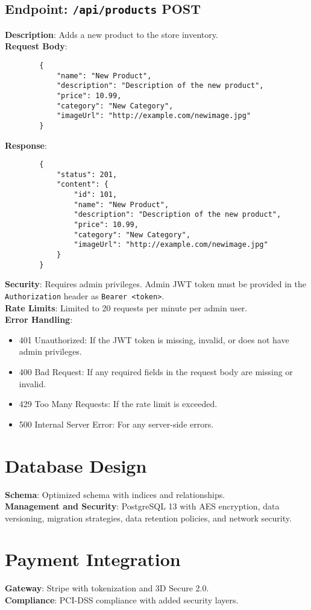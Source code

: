 \documentclass[a4paper,12pt]{article}
\begin{document}
	\subsection*{Endpoint: \texttt{/api/products} POST}
	\textbf{Description}: Adds a new product to the store inventory. \\
	\textbf{Request Body}:
	\begin{lstlisting}
		{
			"name": "New Product",
			"description": "Description of the new product",
			"price": 10.99,
			"category": "New Category",
			"imageUrl": "http://example.com/newimage.jpg"
		}
	\end{lstlisting}
	\textbf{Response}:
	\begin{lstlisting}
		{
			"status": 201,
			"content": {
				"id": 101,
				"name": "New Product",
				"description": "Description of the new product",
				"price": 10.99,
				"category": "New Category",
				"imageUrl": "http://example.com/newimage.jpg"
			}
		}
	\end{lstlisting}
	\textbf{Security}: Requires admin privileges. Admin JWT token must be provided in the \texttt{Authorization} header as \texttt{Bearer <token>}. \\
	\textbf{Rate Limits}: Limited to 20 requests per minute per admin user. \\
	\textbf{Error Handling}:
	\begin{itemize}
		\item 401 Unauthorized: If the JWT token is missing, invalid, or does not have admin privileges.
		\item 400 Bad Request: If any required fields in the request body are missing or invalid.
		\item 429 Too Many Requests: If the rate limit is exceeded.
		\item 500 Internal Server Error: For any server-side errors.
	\end{itemize}
	
	\section*{Database Design}
	\textbf{Schema}: Optimized schema with indices and relationships. \\
	\textbf{Management and Security}: PostgreSQL 13 with AES encryption, data versioning, migration strategies, data retention policies, and network security.
	
	\section*{Payment Integration}
	\textbf{Gateway}: Stripe with tokenization and 3D Secure 2.0. \\
	\textbf{Compliance}: PCI-DSS compliance with added security layers.
	
\end{document}
